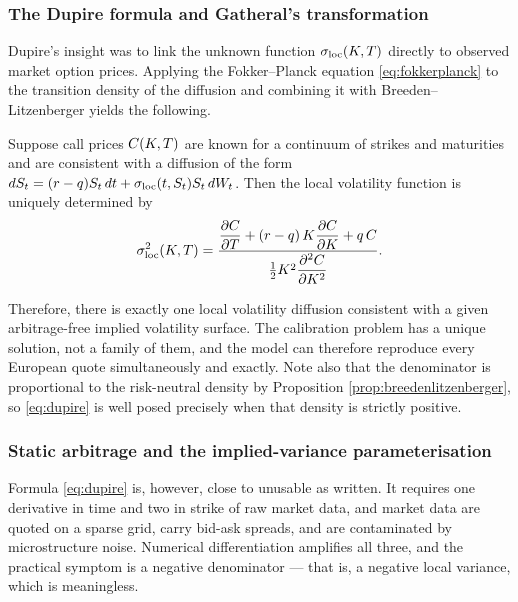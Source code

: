 \subsubsection*{The Dupire formula and Gatheral's transformation}

Dupire's insight was to link the unknown function $\sigma_{\mathrm{loc}}(K,T)$ directly to observed market 
option prices. Applying the Fokker--Planck equation \eqref{eq:fokkerplanck} to the transition density 
of the diffusion and combining it with Breeden--Litzenberger yields the following.

\begin{theorem}[Dupire]\label{thm:dupire}
Suppose call prices $C(K,T)$ are known for a continuum of strikes and maturities and are 
consistent with a diffusion of the form $dS_t = (r-q)S_t\,dt + \sigma_{\mathrm{loc}}(t,S_t)S_t\,dW_t$. 
Then the local volatility function is uniquely determined by
\begin{equation} \label{eq:dupire}
    \sigma_{\mathrm{loc}}^2(K, T) = \frac{\dfrac{\partial C}{\partial T} + (r-q)\,K \dfrac{\partial C}{\partial K} + q\,C}{\tfrac{1}{2} K^2 \dfrac{\partial^2 C}{\partial K^2}} .
\end{equation}
\qedopen
\end{theorem}

Therefore, there is 
exactly one local volatility diffusion consistent with a given arbitrage-free implied volatility surface. The 
calibration problem has a unique solution, not a family of them, and the model can therefore 
reproduce every European quote simultaneously and exactly. Note also that the denominator is 
proportional to the risk-neutral density by Proposition \ref{prop:breedenlitzenberger}, so 
\eqref{eq:dupire} is well posed precisely when that density is strictly positive.

\subsubsection*{Static arbitrage and the implied-variance parameterisation}

Formula \eqref{eq:dupire} is, however, close to unusable as written. It requires one derivative in 
time  and two in strike of raw market data, and market data are quoted on a sparse grid, carry 
bid-ask spreads, and are contaminated by microstructure noise. Numerical differentiation amplifies 
all three, and the practical symptom is a negative denominator --- that is, a negative local 
variance, which is meaningless.

